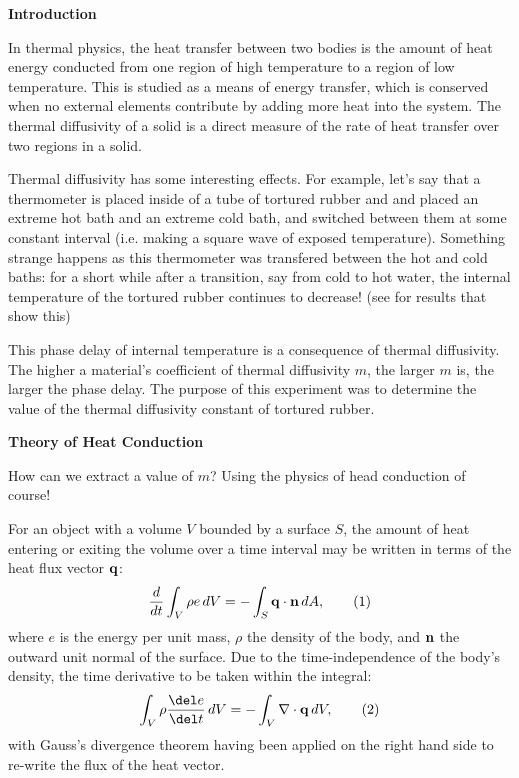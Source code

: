 \documentclass[11pt]{article}
\begin{document}
\begin{multicols}{2}


     \selectfont \textbf{Introduction}
    
     \selectfont 
    
    In thermal physics, the heat transfer between two bodies is the amount of heat energy conducted from one region of high temperature to a region of low temperature. This is studied as a means of energy transfer, which is conserved when no external elements contribute by adding more heat into the system. The thermal diffusivity of a solid is a direct measure of the rate of heat transfer over two regions in a solid.

    Thermal diffusivity has some interesting effects. For example, let's say that a thermometer is placed inside of a tube of tortured rubber and and placed an extreme hot bath and an extreme cold bath, and switched between them at some constant interval (i.e. making a square wave of exposed temperature). Something strange happens as this thermometer was transfered between the hot and cold baths: for a short while after a transition, say from cold to hot water, the internal temperature of the tortured rubber continues to decrease! (see \label{temperatureGraph} for results that show this)
    
    This phase delay of internal temperature is a consequence of thermal diffusivity. The higher a material's coefficient of thermal diffusivity $m$, the larger $m$ is, the larger the phase delay. The purpose of this experiment was to determine the value of the thermal diffusivity constant of tortured rubber. 


    \vspace{10pt}

     \selectfont \textbf{Theory of Heat Conduction}
    
     \selectfont 

    How can we extract a value of $m$? Using the physics of head conduction of course!
     

    For an object with a volume $V$ bounded by a surface $S$, the amount of heat entering or exiting the volume over a time interval may be written in terms of the heat flux vector ${\bf{q}}$:
    \[
        \frac{d}{dt}\int_V \rho e\, dV = -\int_S {\bf{q}}\cdot {\bf{n}}\, dA,  \tag{1} 
    \]
    \nd where $e$ is the energy per unit mass, $\rho$ the density of the body, and ${\bf{n}}$ the outward unit normal of the surface. Due to the time-independence of the body's density, the time derivative to be taken within the integral: 
    \[
        \int_V \rho \frac{\del e}{\del t}\, dV = -\int_V\nabla\cdot {\bf{q}}\, dV,  \tag{2}
    \]
    \nd with Gauss's divergence theorem having been applied on the right hand side to re-write the flux of the heat vector.


\end{multicols}
\end{document}

